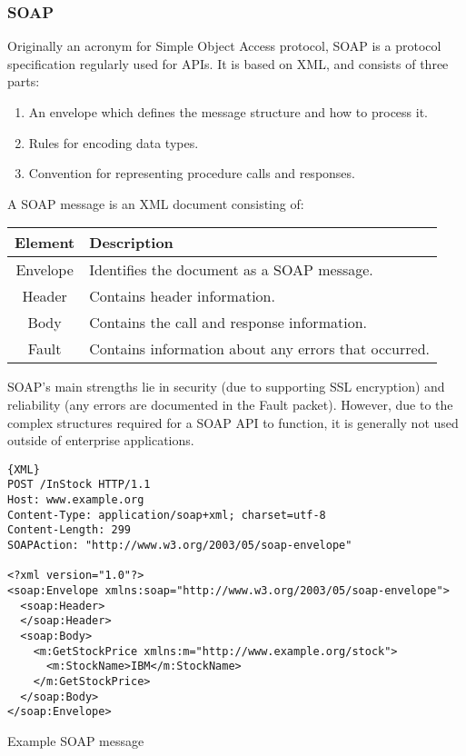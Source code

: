 \subsubsection{SOAP}
Originally an acronym for Simple Object Access protocol, SOAP\cite{soap12} is a protocol specification regularly used for APIs. It is based on XML, and consists of three parts:

\begin{enumerate}
\item An envelope which defines the message structure and how to process it.
\item Rules for encoding data types.
\item Convention for representing procedure calls and responses.
\end{enumerate}

\noindent
A SOAP message is an XML document consisting of:

\begin{center}
\begin{tabular}{c| p{10cm}}
\textbf{Element} & \textbf{Description} \\ \hline
Envelope & Identifies the document as a SOAP message. \\
Header & Contains header information. \\
Body & Contains the call and response information. \\
Fault & Contains information about any errors that occurred. \\
\end{tabular}
\end{center}
\noindent 

SOAP's main strengths lie in security (due to supporting SSL encryption) and reliability (any errors are documented in the Fault packet). However, due to the complex structures required for a SOAP API to function, it is generally not used outside of enterprise applications.

\begin{code}
\begin{lstlisting}[frame=lines]{XML}
POST /InStock HTTP/1.1
Host: www.example.org
Content-Type: application/soap+xml; charset=utf-8
Content-Length: 299
SOAPAction: "http://www.w3.org/2003/05/soap-envelope"
 
<?xml version="1.0"?>
<soap:Envelope xmlns:soap="http://www.w3.org/2003/05/soap-envelope">
  <soap:Header>
  </soap:Header>
  <soap:Body>
    <m:GetStockPrice xmlns:m="http://www.example.org/stock">
      <m:StockName>IBM</m:StockName>
    </m:GetStockPrice>
  </soap:Body>
</soap:Envelope>
\end{lstlisting}
\caption{Example SOAP message}
\end{code}

